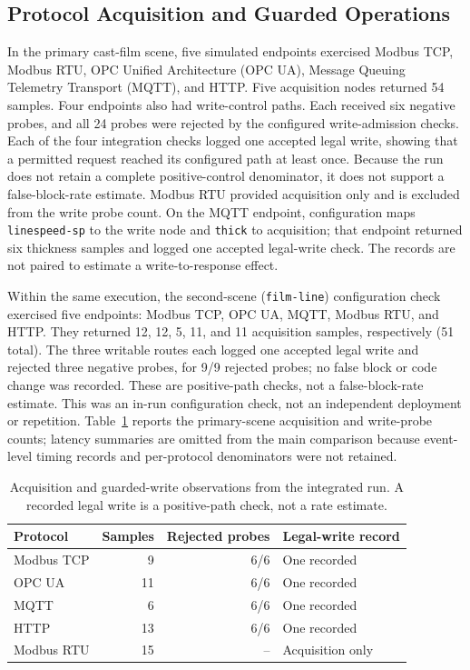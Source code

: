 \subsection{Protocol Acquisition and Guarded Operations}
\label{sec:eval-protocol-results}
In the primary cast-film scene, five simulated endpoints exercised Modbus TCP,
Modbus RTU, OPC Unified Architecture (OPC UA), Message Queuing Telemetry
Transport (MQTT), and HTTP.
Five acquisition nodes returned 54 samples. Four endpoints also had
write-control paths. Each received six negative probes, and all 24 probes were
rejected by the configured write-admission checks. Each of the four integration checks logged
one accepted legal write, showing that a permitted request reached its
configured path at least once. Because the run does not retain a complete
positive-control denominator, it does not support a false-block-rate
estimate. Modbus RTU provided acquisition only and is excluded from the write
probe count. On the MQTT endpoint, configuration maps \texttt{linespeed-sp}
to the write node and \texttt{thick} to acquisition; that endpoint returned
six thickness samples and logged one accepted legal-write check. The records
are not paired to estimate a write-to-response effect.

Within the same execution, the second-scene (\texttt{film-line}) configuration
check exercised five endpoints: Modbus TCP, OPC UA, MQTT, Modbus
RTU, and HTTP. They returned 12, 12, 5, 11, and 11 acquisition samples,
respectively (51 total). The three writable routes each logged one accepted
legal write and rejected three negative probes, for 9/9 rejected probes; no
false block or code change was recorded. These are positive-path checks, not a
false-block-rate estimate. This was an in-run configuration check, not an
independent deployment or repetition. Table~\ref{tab:protocol-results}
reports the primary-scene acquisition and write-probe counts; latency summaries
are omitted from the main comparison because event-level timing records and
per-protocol denominators were not retained.

\begin{table}[!t]
\centering
\caption{Acquisition and guarded-write observations from the integrated
run. A recorded legal write is a positive-path check, not a rate estimate.}
\label{tab:protocol-results}
\footnotesize
\setlength{\tabcolsep}{3pt}
\begin{tabularx}{\columnwidth}{@{}>{\raggedright\arraybackslash}p{1.25cm}r r X@{}}
\toprule
Protocol & Samples & Rejected probes & Legal-write record\\
\midrule
Modbus TCP & 9 & 6/6 & One recorded\\
OPC UA & 11 & 6/6 & One recorded\\
MQTT & 6 & 6/6 & One recorded\\
HTTP & 13 & 6/6 & One recorded\\
Modbus RTU & 15 & -- & Acquisition only\\
\bottomrule
\end{tabularx}
\end{table}

